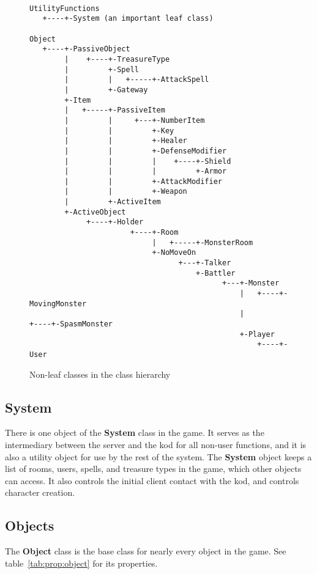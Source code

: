 \documentclass[12pt]{article}
\newcommand{\class}[1]{\textbf{#1}}
\begin{document}
\begin{figure}

\begin{verbatim}

UtilityFunctions
   +----+-System (an important leaf class)

Object
   +----+-PassiveObject
        |    +----+-TreasureType
        |         +-Spell
        |         |   +-----+-AttackSpell
        |         +-Gateway
        +-Item
        |   +-----+-PassiveItem
        |         |     +---+-NumberItem
        |         |         +-Key
        |         |         +-Healer
        |         |         +-DefenseModifier
        |         |         |    +----+-Shield
        |         |         |         +-Armor
        |         |         +-AttackModifier
        |         |         +-Weapon
        |         +-ActiveItem
        +-ActiveObject
             +----+-Holder
                       +----+-Room
                            |   +-----+-MonsterRoom
                            +-NoMoveOn
                                  +---+-Talker
                                      +-Battler
                                            +---+-Monster
                                                |   +----+-MovingMonster
                                                |             +----+-SpasmMonster
                                                +-Player
                                                    +----+-User
\end{verbatim}

\caption{Non-leaf classes in the class hierarchy}
\label{fig:hierarchy}

\end{figure}

\subsection{System}

There is one object of the \class{System} class in the game.  It
serves as the intermediary between the server and the kod for all
non-user functions, and it is also a utility object for use by the
rest of the system.  The \class{System} object keeps a list of rooms,
users, spells, and treasure types in the game, which other objects can
access.  It also controls the initial client contact with the kod,
and controls character creation.

\subsection{Objects}
The \class{Object} class is the base class for nearly every object in the
game.  See table~\ref{tab:prop:object} for its properties.
\end{document}

